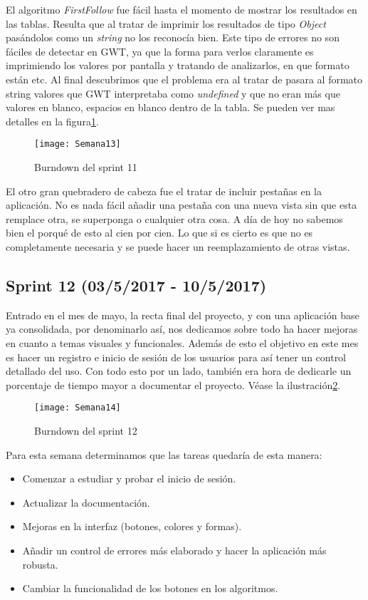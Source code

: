 El algoritmo \emph{FirstFollow} fue fácil hasta el momento de mostrar los resultados en las tablas. Resulta que al tratar de imprimir los resultados de tipo \emph{Object} pasándolos como un \emph{string} no los reconocía bien. Este tipo de errores no son fáciles de detectar en GWT, ya que la forma para verlos claramente es imprimiendo los valores por pantalla y tratando de analizarlos, en que formato están etc. Al final descubrimos que el problema era al tratar de pasara al formato string valores que GWT interpretaba como \emph{undefined} y que no eran más que valores en blanco, espacios en blanco dentro de la tabla. Se pueden ver mas detalles en la figura\ref{fig:A.10}.

\begin{figure}[h]
\centering
\texttt{[image: Semana13]}
\caption{Burndown del sprint 11}
\label{fig:A.10}
\end{figure}

El otro gran quebradero de cabeza fue el tratar de incluir pestañas en la aplicación. No es nada fácil añadir una pestaña con una nueva vista sin que esta remplace otra, se superponga o cualquier otra cosa. A día de hoy no sabemos bien el porqué de esto al cien por cien. Lo que si es cierto es que no es completamente necesaria y se puede hacer un reemplazamiento de otras vistas.

\subsection{Sprint 12 (03/5/2017 - 10/5/2017)}

Entrado en el mes de mayo, la recta final del proyecto, y con una aplicación base ya consolidada, por denominarlo así, nos dedicamos sobre todo ha hacer mejoras en cuanto a temas visuales y funcionales. Además de esto el objetivo en este mes es hacer un registro e inicio de sesión de los usuarios para así tener un control detallado del uso.
Con todo esto por un lado, también era hora de dedicarle un porcentaje de tiempo mayor a documentar el proyecto. Véase la ilustración\ref{fig:A.11}.

\begin{figure}[h]
\centering
\texttt{[image: Semana14]}
\caption{Burndown del sprint 12}
\label{fig:A.11}
\end{figure}

Para esta semana determinamos que las tareas quedaría de esta manera:

\begin{itemize}
\item Comenzar a estudiar y probar el inicio de sesión.
\item Actualizar la documentación.
\item Mejoras en la interfaz (botones, colores y formas).
\item Añadir un control de errores más elaborado y hacer la aplicación más robusta.
\item Cambiar la funcionalidad de los botones en los algoritmos.
\end{itemize}


